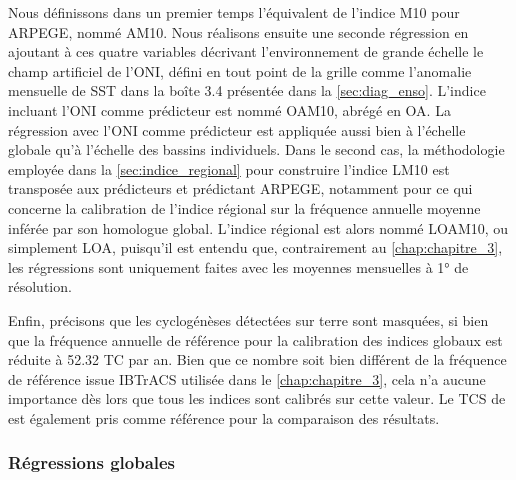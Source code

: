 \documentclass[../main.tex]{subfiles}
\begin{document}
Nous définissons dans un premier temps l'équivalent de l'indice M10 pour ARPEGE, nommé AM10. Nous réalisons ensuite une seconde régression en ajoutant à
ces quatre variables décrivant l'environnement de grande échelle le champ artificiel de l'ONI, défini en tout point de la grille comme l'anomalie
mensuelle de SST dans la boîte 3.4 présentée dans la \cref{sec:diag_enso}. L'indice incluant l'ONI comme prédicteur est nommé OAM10, abrégé en OA. La régression
avec l'ONI comme prédicteur est appliquée aussi bien à l'échelle globale qu'à l'échelle des bassins individuels. Dans le second cas, la méthodologie employée
dans la \cref{sec:indice_regional} pour construire l'indice LM10 est transposée aux prédicteurs et prédictant ARPEGE, notamment pour ce qui concerne la
calibration de l'indice régional sur la fréquence annuelle moyenne inférée par son homologue global. L'indice régional est alors nommé LOAM10, ou simplement
LOA, puisqu'il est entendu que, contrairement au \cref{chap:chapitre_3}, les régressions sont uniquement faites avec les moyennes mensuelles à \ang{1} de
résolution.

Enfin, précisons que les cyclogénèses détectées sur terre sont masquées, si bien que la fréquence annuelle de référence pour la calibration des indices globaux
est réduite à \num{52.32} TC par an. Bien que ce nombre soit bien différent de la fréquence de référence issue IBTrACS utilisée dans le \cref{chap:chapitre_3},
cela n'a aucune importance dès lors que tous les indices sont calibrés sur cette valeur. Le TCS de \textcite{tippett_poisson_2011} est également pris comme
référence pour la comparaison des résultats.

\subsubsection{Régressions globales}
\end{document}
